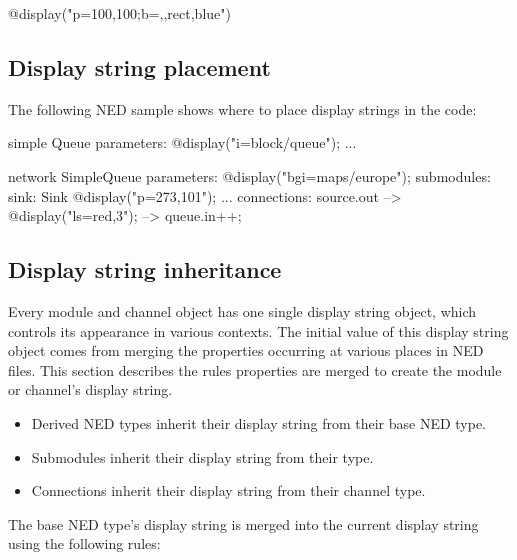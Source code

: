 \begin{ned}
@display("p=100,100;b=,,rect,blue")
\end{ned}

\subsection{Display string placement}

The following NED sample shows where to place display strings in the code:

\begin{ned}
simple Queue
{
    parameters:
        @display("i=block/queue");
    ...
}

network SimpleQueue
{
    parameters:
        @display("bgi=maps/europe");
    submodules:
        sink: Sink {
            @display("p=273,101");
        }
        ...
    connections:
        source.out --> { @display("ls=red,3"); } --> queue.in++;
}
\end{ned}

\subsection{Display string inheritance}

Every module and channel object has one single display string object,
which controls its appearance in various contexts. The initial value of
this display string object comes from merging the 
properties occurring at various places in NED files.
This section describes the rules  properties are merged
to create the module or channel's display string.

\begin{itemize}
  \item Derived NED types inherit their display string from their base NED type.
  \item Submodules inherit their display string from their type.
  \item Connections inherit their display string from their channel type.
\end{itemize}

The base NED type's display string is merged into the current display string
using the following rules:

